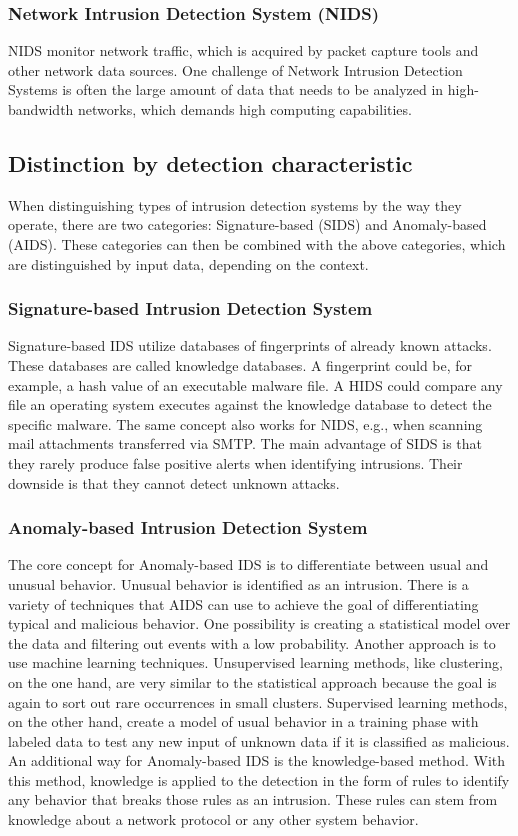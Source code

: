 \documentclass[
    fontsize=12pt,
    headings=small,
    parskip=half,           %
    bibliography=totoc,
    numbers=noenddot,       %
    open=any,               %
    ]{scrreprt}
\begin{document}
\subsubsection{Network Intrusion Detection System (NIDS)}
NIDS monitor network traffic, which is acquired by packet capture tools and other network data sources. One challenge of Network Intrusion Detection Systems is often the large amount of data that needs to be analyzed in high-bandwidth networks, which demands high computing capabilities.

\subsection{Distinction by detection characteristic}
When distinguishing types of intrusion detection systems by the way they operate, there are two categories: Signature-based (SIDS) and Anomaly-based (AIDS). These categories can then be combined with the above categories, which are distinguished by input data, depending on the context.

\subsubsection{Signature-based Intrusion Detection System}
Signature-based IDS utilize databases of fingerprints of already known attacks. These databases are called knowledge databases. A fingerprint could be, for example, a hash value of an executable malware file. A HIDS could compare any file an operating system executes against the knowledge database to detect the specific malware. The same concept also works for NIDS, e.g., when scanning mail attachments transferred via SMTP. The main advantage of SIDS is that they rarely produce false positive alerts when identifying intrusions. Their downside is that they cannot detect unknown attacks.

\subsubsection{Anomaly-based Intrusion Detection System}
The core concept for Anomaly-based IDS is to differentiate between usual and unusual behavior. Unusual behavior is identified as an intrusion. There is a variety of techniques that AIDS can use to achieve the goal of differentiating typical and malicious behavior. One possibility is creating a statistical model over the data and filtering out events with a low probability. 
Another approach is to use machine learning techniques. Unsupervised learning methods, like clustering, on the one hand, are very similar to the statistical approach because the goal is again to sort out rare occurrences in small clusters. Supervised learning methods, on the other hand, create a model of usual behavior in a training phase with labeled data to test any new input of unknown data if it is classified as malicious. 
An additional way for Anomaly-based IDS is the knowledge-based method. With this method, knowledge is applied to the detection in the form of rules to identify any behavior that breaks those rules as an intrusion. These rules can stem from knowledge about a network protocol or any other system behavior.
\end{document}
